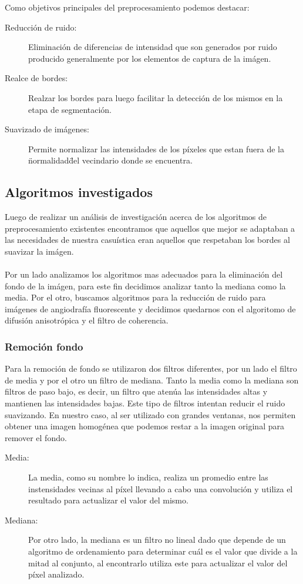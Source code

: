 Como objetivos principales del preprocesamiento podemos destacar:
\begin{description}
  \item[Reducci\'on de ruido:] Eliminaci\'on de diferencias de intensidad que son generados por ruido producido generalmente por los elementos de captura de la im\'agen.
  \item[Realce de bordes:] Realzar los bordes para luego facilitar la detecci\'on de los mismos en la etapa de segmentaci\'on.
  \item[Suavizado de im\'agenes:] Permite normalizar las intensidades de los p\'ixeles que estan fuera de la \"normalidad\" del vecindario donde se encuentra.
\end{description}

\subsection{Algoritmos investigados}

Luego de realizar un an\'alisis de investigaci\'on acerca de los algoritmos de preprocesamiento existentes encontramos que aquellos que mejor se adaptaban a las necesidades de nuestra casu\'istica eran aquellos que respetaban los bordes al suavizar la im\'agen.\\
\\
Por un lado analizamos los algoritmos mas adecuados para la eliminaci\'on del fondo de la im\'agen, para este fin decidimos analizar tanto la mediana como la media. Por el otro, buscamos algoritmos para la reducci\'on de ruido para im\'agenes de angiodraf\'ia fluorescente y decidimos quedarnos con el algoritomo de difusi\'on anisotr\'opica y el filtro de coherencia.

\subsubsection{Remoci\'on fondo}

Para la remoci\'on de fondo se utilizaron dos filtros diferentes, por un lado el filtro de media y por el otro un filtro de mediana. Tanto la media como la mediana son filtros de paso bajo, es decir, un filtro que aten\'ua las intensidades altas y mantienen las intensidades bajas. Este tipo de filtros intentan reducir el ruido suavizando. En nuestro caso, al ser utilizado con grandes ventanas, nos permiten obtener una imagen homogénea que podemos restar a la imagen original para remover el fondo.

\begin{description}
  \item[Media:] La media, como su nombre lo indica, realiza un promedio entre las instensidades vecinas al p\'ixel llevando a cabo una convoluci\'on y utiliza el resultado para actualizar el valor del mismo.
  \item[Mediana:] Por otro lado, la mediana es un filtro no lineal dado que depende de un algoritmo de ordenamiento para determinar cu\'al es el valor que divide a la mitad al conjunto, al encontrarlo utiliza este para actualizar el valor del p\'ixel analizado.
\end{description}

